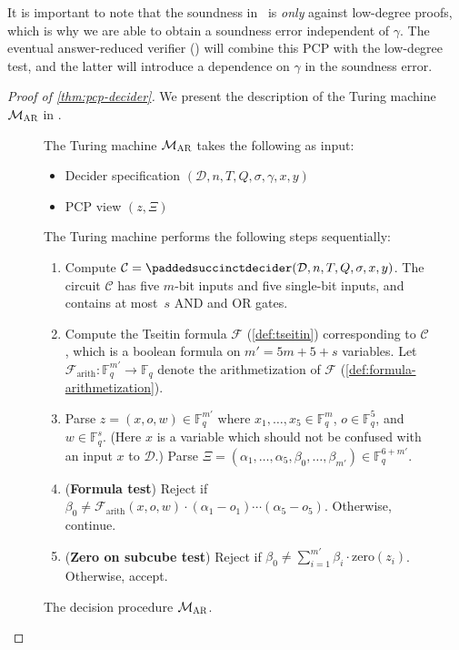 \documentclass[11pt]{article}
\theoremstyle{definition}
\newcommand{\F}{\ensuremath{\mathbb{F}}}
\newcommand{\decider}{\mathcal{D}}
\newcommand{\gamestyle}[1]{\ensuremath{\textsc{#1}}\xspace}
\newcommand{\ar}{\gamestyle{AR}}
\newenvironment{gamespec}{
  \begin{mdframed}[style=figstyle]}{
  \end{mdframed}}
\newcommand{\circuit}{\mathcal{C}}
\newcommand{\formula}{\mathcal{F}}
\newcommand{\pcpverifier}{\mathcal{M}_\ar}
\newcommand{\qlen}{Q}
\begin{document}
It is important to note that the soundness in~ is
\emph{only} against low-degree proofs, which is why we are able to
obtain a soundness error independent of $\gamma$. The eventual
answer-reduced verifier () will combine this PCP with the low-degree
test, and the latter will introduce a dependence on $\gamma$ in the
soundness error.

\begin{proof}[Proof of \cref{thm:pcp-decider}]


  We present the description of the Turing machine $\pcpverifier$ in
  .
  
\begin{figure}[!htb]
  \begin{gamespec}
  The Turing machine $\pcpverifier$ takes the following as input:
	\begin{itemize}
		\item Decider specification $(\decider, n, T, \qlen,
      \sigma, \gamma, x, y)$
      	\item PCP view $(z,\Xi)$
	\end{itemize}
	The Turing machine performs the following steps sequentially:
  \begin{enumerate}
  \item \label{enu:compute-circuit} Compute $\circuit =
    \paddedsuccinctdecider(\decider, n, T, \qlen, \sigma, x, y)$.
    The circuit $\circuit$ has five $m$-bit inputs and five single-bit inputs,
    and contains at most~$s$ AND and OR gates.
    


  \item \label{enu:compute-tseitin-formula} Compute the Tseitin formula
    $\formula$ (\cref{def:tseitin}) corresponding to $\circuit$, which is a boolean formula on $m' =
    5m + 5 + s$ variables.
    Let $\formula_{\mathrm{arith}}: \F_q^{m'} \to \F_q$ denote the
    arithmetization of $\formula$ (\cref{def:formula-arithmetization}).
  \item \label{enu:parse-input} Parse $z = (x,o,w) \in \F_q^{m'}$ where
    $x_1,\ldots,x_5 \in \F_q^m$, $o \in \F_q^5$, and $w \in \F_q^s$. (Here $x$ is a variable which should not be confused with an input $x$ to $\decider$.)
    Parse $\Xi = (\alpha_1,\ldots,\alpha_5,\beta_0,\ldots,\beta_{m'}) \in
    \F_q^{6 + m'}$.
  
  \item (\textbf{Formula test}) \label{enu:formula-test} Reject if $\beta_0 \neq
    \formula_{\mathrm{arith}}(x,o,w) \cdot (\alpha_1 - o_1) \cdots (\alpha_5 -
    o_5)$.
    Otherwise, continue.
  \item (\textbf{Zero on subcube test}) \label{enu:zero-test} Reject if $\beta_0
    \neq \sum_{i=1}^{m'} \beta_i \cdot \mathrm{zero}(z_i)$.
    Otherwise, accept.
  \end{enumerate}
  \end{gamespec}
\caption{The decision procedure $\pcpverifier$.}
\label{fig:pcpverifier}
\end{figure}


\end{proof}
\end{document}
